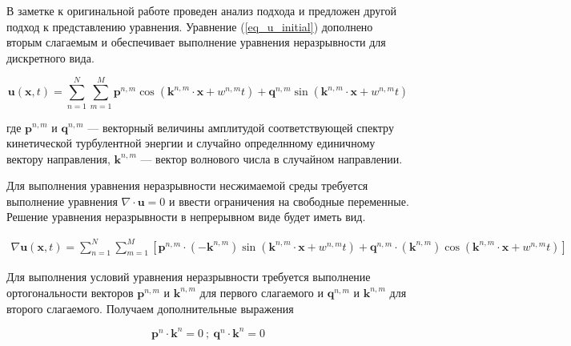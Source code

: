 \documentclass[12pt,a4paper]{article}
\begin{document}
В заметке \cite{saad_comment_2016}  к оригинальной работе \cite{kraichnan_diffusion_1970} проведен анализ подхода и предложен другой подход к представлению уравнения. Уравнение (\ref{eq_u_initial}) дополнено вторым слагаемым и обеспечивает выполнение уравнения неразрывности для дискретного вида. 

\begin{equation} \label{eq_u_initial}
\boldsymbol{u}(\boldsymbol{x},t) = 
\sum_{n=1}^N \sum_{m=1}^M \boldsymbol{p}^{n,m} 
\cos{\left( \boldsymbol{k}^{n,m} \cdot \boldsymbol{x} + w^{n,m} t \right)} + 
\boldsymbol{q}^{n,m} \sin{\left( \boldsymbol{k}^{n,m} 
	\cdot \boldsymbol{x} + w^{n,m} t \right)}
\end{equation}

где $\boldsymbol{p}^{n,m}$ и $\boldsymbol{q}^{n,m}$ --- векторный величины амплитудой соответствующей спектру кинетической турбулентной энергии и случайно определнному единичному вектору направления, $\boldsymbol{k}^{n,m}$ --- вектор волнового числа в случайном направлении. 


Для выполнения уравнения неразрывности несжимаемой среды требуется выполнение уравнения $\nabla \cdot \boldsymbol{u} = 0$ и ввести ограничения на свободные переменные. Решение уравнения неразрывности в непрерывном виде будет иметь вид.

\begin{eqnarray} \label{eq_u_mass_con}
\nabla\boldsymbol{u}(\boldsymbol{x},t) = 
\sum_{n=1}^N \sum_{m=1}^M \left[  \boldsymbol{p}^{n,m}
 \cdot \left(- \boldsymbol{k}^{n,m}\right)  
\sin{\left( \boldsymbol{k}^{n,m} \cdot \boldsymbol{x} + w^{n,m} t \right)} 
	+ \boldsymbol{q}^{n,m} 
\cdot \left( \boldsymbol{k}^{n,m}\right)
\cos{\left( \boldsymbol{k}^{n,m} 
	\cdot \boldsymbol{x} + w^{n,m} t \right)}  \right]
\end{eqnarray}

Для выполнения условий уравнения неразрывности требуется выполнение ортогональности векторов $\boldsymbol{p}^{n,m}$ и $\boldsymbol{k}^{n,m}$ для первого слагаемого и $\boldsymbol{q}^{n,m}$ и $\boldsymbol{k}^{n,m}$ для второго слагаемого. Получаем дополнительные выражения 

\begin{equation}
\boldsymbol{p}^n \cdot \boldsymbol{k}^n = 0\ ;\ \boldsymbol{q}^n \cdot \boldsymbol{k}^n = 0
\end{equation}


\end{document}
